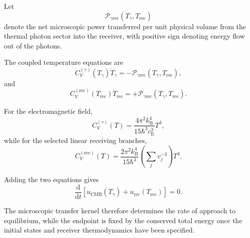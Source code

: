 Let
\begin{equation}
    \mathcal P_{\gamma\mathrm{rec}}
    \left(
        T_\gamma,
        T_{\mathrm{rec}}
    \right)
\end{equation}
denote the net microscopic power transferred per unit physical volume from the
thermal photon sector into the receiver, with positive sign denoting energy
flow out of the photons.

The coupled temperature equations are
\begin{equation}
    C_V^{(\gamma)}
    \left(
        T_\gamma
    \right)
    \dot T_\gamma
    =
    -
    \mathcal P_{\gamma\mathrm{rec}}
    \left(
        T_\gamma,
        T_{\mathrm{rec}}
    \right),
    \label{eq:AT_photon_temperature_evolution}
\end{equation}
and
\begin{equation}
    C_V^{(\mathrm{rec})}
    \left(
        T_{\mathrm{rec}}
    \right)
    \dot T_{\mathrm{rec}}
    =
    +
    \mathcal P_{\gamma\mathrm{rec}}
    \left(
        T_\gamma,
        T_{\mathrm{rec}}
    \right).
    \label{eq:AT_receiver_temperature_evolution}
\end{equation}

For the electromagnetic field,
\begin{equation}
    C_V^{(\gamma)}(T)
    =
    \frac{
        4\pi^2k_{\mathrm B}^4
    }{
        15\hbar^3c_{\mathrm E}^3
    }
    T^3,
    \label{eq:AT_photon_heat_capacity}
\end{equation}
while for the selected linear receiving branches,
\begin{equation}
    C_V^{(\mathrm{rec})}(T)
    =
    \frac{
        2\pi^2k_{\mathrm B}^4
    }{
        15\hbar^3
    }
    \left(
        \sum_jv_j^{-3}
    \right)
    T^3.
    \label{eq:AT_receiver_heat_capacity}
\end{equation}

Adding the two equations gives
\begin{equation}
    \frac{\mathrm d}{\mathrm dt}
    \left[
        u_{\mathrm{CMB}}(T_\gamma)
        +
        u_{\mathrm{rec}}(T_{\mathrm{rec}})
    \right]
    =
    0.
    \label{eq:AT_two_sector_energy_conservation}
\end{equation}

The microscopic transfer kernel therefore determines the rate of approach to
equilibrium, while the endpoint is fixed by the conserved total energy once
the initial states and receiver thermodynamics have been specified.


